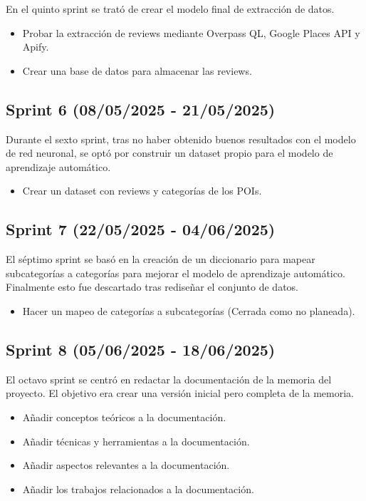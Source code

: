 En el quinto sprint se trató de crear el modelo final de extracción de datos.

\begin{itemize}
    \item Probar la extracción de reviews mediante Overpass QL, Google Places API y Apify.
    \item Crear una base de datos para almacenar las reviews.
\end{itemize}

\subsection{Sprint 6 (08/05/2025 - 21/05/2025)}

Durante el sexto sprint, tras no haber obtenido buenos resultados con el modelo de red neuronal, se optó por construir un dataset propio para el modelo de aprendizaje automático.

\begin{itemize}
    \item Crear un dataset con reviews y categorías de los POIs.
\end{itemize}

\subsection{Sprint 7 (22/05/2025 - 04/06/2025)}

El séptimo sprint se basó en la creación de un diccionario para mapear subcategorías a categorías para mejorar el modelo de aprendizaje automático.
Finalmente esto fue descartado tras rediseñar el conjunto de datos.

\begin{itemize}
    \item Hacer un mapeo de categorías a subcategorías (Cerrada como no planeada).
\end{itemize}

\subsection{Sprint 8 (05/06/2025 - 18/06/2025)}

El octavo sprint se centró en redactar la documentación de la memoria del proyecto. El objetivo era crear una versión inicial pero completa de la memoria.

\begin{itemize}
    \item Añadir conceptos teóricos a la documentación.
    \item Añadir técnicas y herramientas a la documentación.
    \item Añadir aspectos relevantes a la documentación.
    \item Añadir los trabajos relacionados a la documentación.
\end{itemize}

